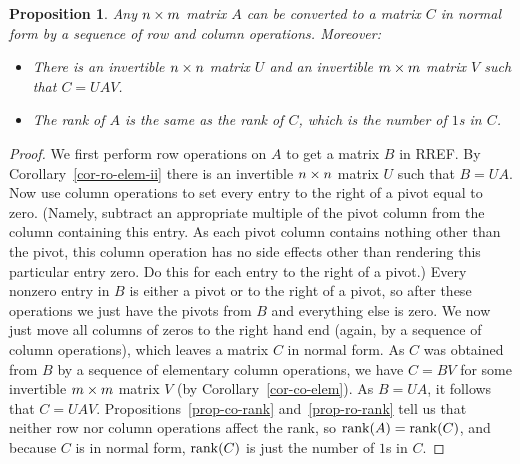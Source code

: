 \documentclass[reqno]{amsart}
\newtheorem{proposition}[theorem]{Proposition}
\theoremstyle{definition}
\begin{document}
\begin{proposition}\label{prop-normal-form}
 Any $n\times m$ matrix $A$ can be converted to a matrix $C$ in normal
 form by a sequence of row and column operations.  Moreover:
 \begin{itemize}
  \item[(a)] There is an invertible $n\times n$ matrix $U$ and an invertible
   $m\times m$ matrix $V$ such that $C=UAV$.
  \item[(b)] The rank of $A$ is the same as the rank of $C$, which is
   the number of $1$s in $C$.
 \end{itemize}
\end{proposition}
\begin{proof}
 We first perform row operations on $A$ to get a matrix $B$ in RREF.  By
 Corollary~\ref{cor-ro-elem-ii} there is an invertible $n\times n$ matrix
 $U$ such that $B=UA$.
 Now use column operations to set every entry to the right
 of a pivot equal to zero.
 (Namely, subtract an appropriate multiple of the pivot column
 from the column containing this entry.
 As each pivot column contains nothing other than the pivot,
 this column operation has no side effects other than rendering
 this particular entry zero.  Do this for each entry to the right of
 a pivot.)
 Every nonzero entry in $B$ is either a pivot or to the right of a
 pivot, so after these operations we just have the pivots from $B$ and
 everything else is zero.  We now just move all columns of zeros to
 the right hand end (again, by a sequence of column operations),
 which leaves a matrix $C$ in normal form.  As $C$
 was obtained from $B$ by a sequence of elementary column operations,
 we have $C=BV$ for some invertible $m\times m$ matrix $V$
 (by Corollary~\ref{cor-co-elem}).  As $B=UA$,
 it follows that $C=UAV$.  Propositions~\ref{prop-co-rank}
 and~\ref{prop-ro-rank} tell us that neither row nor column operations
 affect the rank, so $\operatorname{rank}(A)=\operatorname{rank}(C)$, and because $C$ is in normal
 form, $\operatorname{rank}(C)$ is just the number of $1$s in $C$.
\end{proof}
\end{document}
